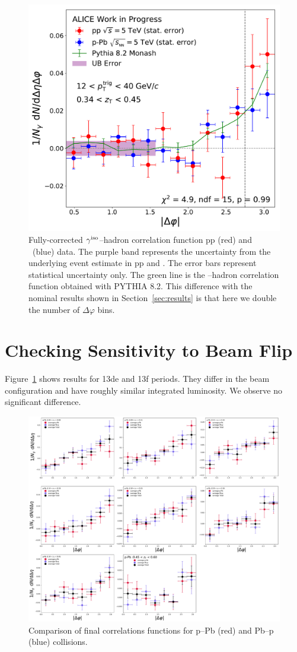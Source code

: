 \begin{figure}
\includegraphics[width = 0.24 \textwidth]{G-H_New/16_dPhi/Cs_Final_Indv_pT_0_zT_6.pdf}
\caption{Fully-corrected $\gamma^\mathrm{iso}$--hadron correlation function pp (red) and \pPb~(blue) data. The purple band represents the uncertainty from the underlying event estimate in pp and \pPb. The error bars represent statistical uncertainty only. The green line is the \gammaiso--hadron correlation function obtained with \textsc{PYTHIA 8.2}. This difference with the nominal results shown in Section~\ref{sec:results} is that here we double the number of $\Delta\varphi$ bins.}
\end{figure}


\section{Checking Sensitivity to Beam Flip}
Figure~\ref{fig:Cs_Beam_Flip} shows results for 13de and 13f periods. They differ in the beam configuration and have roughly similar integrated luminosity. We observe no significant difference. 

\begin{figure}
\centering
\includegraphics[width = 0.9 \textwidth]{G-H_New/Cs_Averages_p-Pb_Beam_Flip.pdf}
\caption{Comparison of final correlations functions for p--Pb (red) and Pb--p (blue) collisions.}
\label{fig:Cs_Beam_Flip}
\end{figure}



